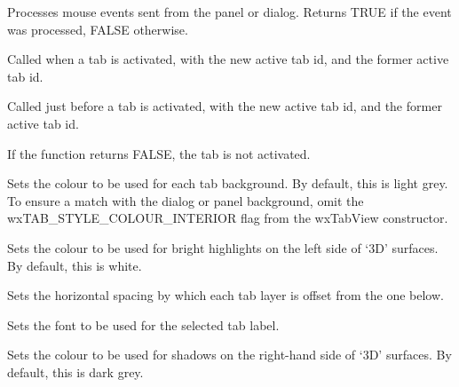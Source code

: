 Processes mouse events sent from the panel or dialog. Returns TRUE if the event was processed,
FALSE otherwise.



Called when a tab is activated, with the new active tab id, and the former active tab id.



Called just before a tab is activated, with the new active tab id, and the former active tab id.

If the function returns FALSE, the tab is not activated.



Sets the colour to be used for each tab background. By default, this is
light grey. To ensure a match with the dialog or panel background, omit
the wxTAB\_STYLE\_COLOUR\_INTERIOR flag from the wxTabView constructor. 



Sets the colour to be used for bright highlights on the left side of `3D' surfaces. By default, this is white.



Sets the horizontal spacing by which each tab layer is offset from the one below.



Sets the font to be used for the selected tab label.



Sets the colour to be used for shadows on the right-hand side of `3D' surfaces. By default, this is dark grey.

